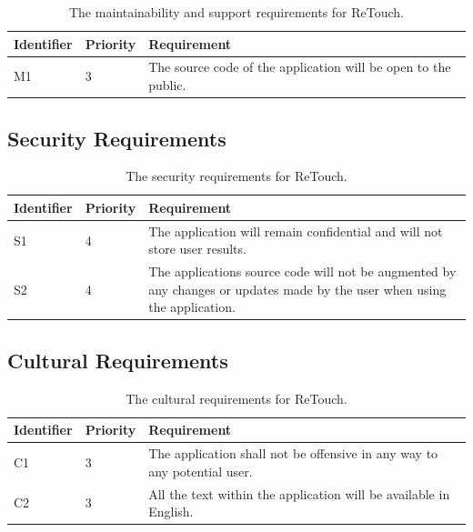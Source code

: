\documentclass[12pt, titlepage]{article}
\begin{document}
\begin{table}[H]
  \caption{The maintainability and support requirements for ReTouch.}
\begin{tabular}{ |m{2cm}|m{1.8cm}|m{9.4cm}| }
    \hline
    \textbf{Identifier} & \textbf{Priority} & \textbf{Requirement} \\ 
    \hline
    {\color{cyan}M1} & 3 & The source code of the application will be open to the public. \\
    \hline
\end{tabular}
\end{table}

\subsection{Security Requirements}

\begin{table}[H]
  \caption{The security requirements for ReTouch.}
\begin{tabular}{ |m{2cm}|m{1.8cm}|m{9.4cm}| }
    \hline
    \textbf{Identifier} & \textbf{Priority} & \textbf{Requirement} \\ 
    \hline
    {\color{cyan}S1} & 4 & The application will remain confidential and will not store user results.\\
    \hline
    {\color{cyan}S2} & 4 & The applications source code will not be augmented by any changes or updates made by the user when using the application. \\
    \hline
\end{tabular}
\end{table}

\subsection{Cultural Requirements}

\begin{table}[H]
  \caption{The cultural requirements for ReTouch.}
\begin{tabular}{ |m{2cm}|m{1.8cm}|m{9.4cm}| }
    \hline
    \textbf{Identifier} & \textbf{Priority} & \textbf{Requirement} \\ 
    \hline
    {\color{cyan}C1} & 3 & The application shall not be offensive in any way to any potential user.\\
    \hline
    {\color{cyan}C2} & 3 & All the text within the application will be available in English. \\
    \hline
\end{tabular}
\end{table}
\end{document}
